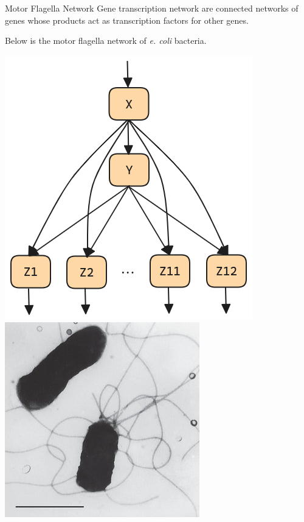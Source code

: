 \documentclass{beamer}
\begin{document}
\begin{frame}{Motor Flagella Network}
    Gene transcription network are connected networks of genes whose products act as transcription factors for other genes.

    \vspace*{0.125in}
    Below is the motor flagella network of \textit{e. coli} bacteria.

    \begin{center}
        \includegraphics[scale=0.25]{multioutput_FFL_color.png}
        \hspace*{0.25in}
        \includegraphics[scale=0.35]{Flagella-of-E-coli-observed-in-transmission-electron-microscope-Bar-1mm_Q320-2724765803.jpg}
    \end{center}
\end{frame}
\end{document}
